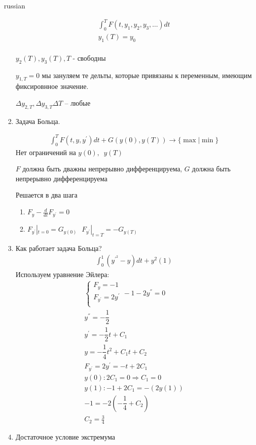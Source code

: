 \documentclass{article}
\begin{document}
\begin{otherlanguage*}{russian}
\begin{enumerate}
\begin{align*}
\int_0^T F(t, y_1, y_2, y_3, \ldots) dt \\
y_1 (T) = y_0 \\
\end{align*}

$ y_2 (T), y_3 (T), T$ - свободны

$ y_{1, T} = 0 $ мы зануляем те дельты, которые привязаны к переменным, имеющим фиксировнное значение. 

$ \Delta y_{2, T}, \Delta y_{3, T} \Delta T $ -- любые

\item Задача Больца. 

\begin{align*}
\int_0^T F(t, y, y^{'} ) dt + G(y(0), y(T)) \rightarrow \{ \max | \min \}
\end{align*}
Нет ограничений на $ y(0), \,\,\, y(T) $ 

$ F $ должна быть дважны непрерывно дифференцируема, $ G $ должна быть непрерывно дифференцируема 

Решается в два шага
\begin{enumerate}
\item $ F_y - \frac{d}{dt} F_{y^{'}} = 0 $ 

\item $ F_{y^{'}}|_{t=0} = G_{y(0)} \,\,\,\, F_{y^{'}}|_{t=T} = - G_{y(T)} $ 
\end{enumerate}
\item Как работает задача Больца? 
\begin{align*}
\int_0^1 (y^{'^{2}} - y) dt + y^2 (1)
\end{align*}
Используем уравнение Эйлера:
\begin{align*}
\begin{cases}
F_y = -1\\
F_{y^{'}} = 2 y^{'} \\ 
\end{cases}
-1 - 2 y ^{''} = 0 \\
y^{''} = - \dfrac{1}{2} \\
y^{'} = - \dfrac{1}{2}t + C_1 \\
y= - \dfrac{1}{4} t^2 + C_1 t + C_2 \\
F_{y^{'}} = 2 y^{'} = - t + 2 C_1 \\
y(0): 2 C_1 = 0 \Rightarrow C_1 = 0 \\
y(1): -1 + 2 C_1 = - (2 y(1)) \\
-1 = - 2 (- \dfrac{1}{4} + C_2) \\
C_2 = \frac{3}{4}
\end{align*}
\item Достаточное условие экстремума 


\end{enumerate}
\end{otherlanguage*}
\end{document}
